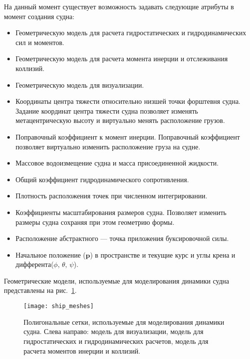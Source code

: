 На данный момент существует возможность задавать следующие атрибуты в момент создания судна:
\begin{itemize}
	\item	Геометрическую модель для расчета гидростатических и гидродинамических сил и моментов.
	\item	Геометрическую модель для расчета момента инерции и отслеживания коллизий.
	\item	Геометрическую модель для визуализации.
	\item	Координаты центра тяжести относительно низшей точки форштевня судна. 
			Задание координат центра тяжести судна позволяет изменять метацентрическую 
			высоту и виртуально менять расположение грузов.
	\item	Поправочный коэффициент к момент инерции. Поправочный коэффициент позволяет 
			виртуально изменить расположение груза на судне.
	\item	Массовое водоизмещение судна и масса присоединенной жидкости.
	\item	Общий коэффициент гидродинамического сопротивления.
	\item	Плотность расположения точек при численном интегрировании.
	\item	Коэффициенты масштабирования размеров судна. 
			Позволяет изменить размеры судна сохраняя при этом геометрию формы.
	\item	Расположение абстрактного  --- точка приложения буксировочной силы.
	\item	Начальное положение ($\mathbf{p}$) в пространстве и текущие курс и углы крена и дифферента($\phi$, $\theta$, $\psi$).
\end{itemize}

Геометрические модели, используемые для моделирования динамики судна представлены на рис.~\ref{ship_meshes}.

\begin{figure}[ht]
\begin{center}
\texttt{[image: ship\_meshes]}
\end{center}
\caption{Полигональные сетки, используемые для моделирования динамики судна. Слева направо: модель для визуализации, модель для гидростатических и гидродинамических расчетов, модель для расчета моментов инерции и коллизий.}
\label{ship_meshes}
\end{figure}




